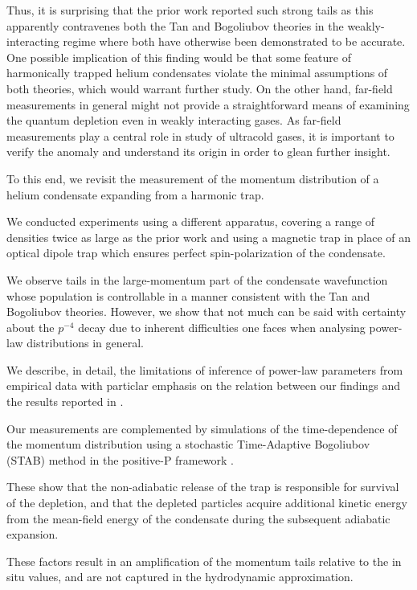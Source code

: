 	Thus, it is surprising that the prior work reported such strong tails as this apparently contravenes both the Tan and Bogoliubov theories in the weakly-interacting regime where both have otherwise been demonstrated to be accurate.
	One possible implication of this finding would be that some feature of harmonically trapped helium condensates violate the minimal assumptions of both theories, which would warrant further study.
	On the other hand, far-field measurements in general might not provide a straightforward means of examining the quantum depletion even in weakly interacting gases.
	As far-field measurements play a central role in study of ultracold gases, it is important to verify the anomaly and understand its origin in order to glean further insight.

	To this end, we revisit the measurement of the momentum distribution of a helium condensate expanding from a harmonic trap.
	
	We conducted experiments using a different apparatus, covering a range of densities twice as large as the prior work and using a magnetic trap in place of an optical dipole trap which ensures perfect spin-polarization of the condensate.
	
	We observe tails in the large-momentum part of the condensate wavefunction whose population is controllable in a manner consistent with the Tan and Bogoliubov theories.
	However, we show that not much can be said with certainty about the $p^{-4}$ decay due to inherent difficulties one faces when analysing power-law distributions in general.
	
	We describe, in detail, the limitations of inference of power-law parameters from empirical data with particlar emphasis on the relation between our findings and the results reported in \cite{Chang16}.
	
	Our measurements are complemented by simulations of the time-dependence of the momentum distribution using a stochastic Time-Adaptive Bogoliubov (STAB) method in the positive-P framework \cite{Deuar11,Kheruntsyan12}.
	
	These show that the non-adiabatic release of the trap is responsible for survival of the depletion, and that the depleted particles acquire additional kinetic energy from the mean-field energy of the condensate during the subsequent adiabatic expansion.
	
	These factors result in an amplification of the momentum tails relative to the in situ values, and are not captured in the hydrodynamic approximation.
	
